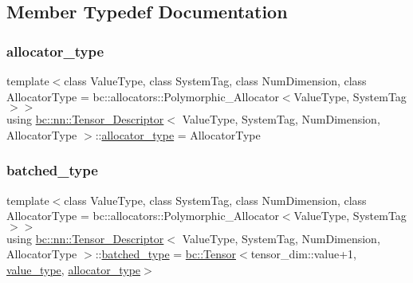 \subsection{Member Typedef Documentation}
\mbox{\label{structbc_1_1nn_1_1Tensor__Descriptor_ad5bd24271db1a9fb05b06cb64cad55a3}} 
\subsubsection{\texorpdfstring{allocator\+\_\+type}{allocator\_type}}
{\footnotesize\ttfamily template$<$class Value\+Type, class System\+Tag, class Num\+Dimension, class Allocator\+Type = bc\+::allocators\+::\+Polymorphic\+\_\+\+Allocator$<$\+Value\+Type, System\+Tag$>$$>$ \\
using \hyperlink{structbc_1_1nn_1_1Tensor__Descriptor}{bc\+::nn\+::\+Tensor\+\_\+\+Descriptor}$<$ Value\+Type, System\+Tag, Num\+Dimension, Allocator\+Type $>$\+::\hyperlink{structbc_1_1nn_1_1Tensor__Descriptor_ad5bd24271db1a9fb05b06cb64cad55a3}{allocator\+\_\+type} =  Allocator\+Type}

\mbox{\label{structbc_1_1nn_1_1Tensor__Descriptor_a5d27a53dccd4d6334aa3fd4092b07a9e}} 
\subsubsection{\texorpdfstring{batched\+\_\+type}{batched\_type}}
{\footnotesize\ttfamily template$<$class Value\+Type, class System\+Tag, class Num\+Dimension, class Allocator\+Type = bc\+::allocators\+::\+Polymorphic\+\_\+\+Allocator$<$\+Value\+Type, System\+Tag$>$$>$ \\
using \hyperlink{structbc_1_1nn_1_1Tensor__Descriptor}{bc\+::nn\+::\+Tensor\+\_\+\+Descriptor}$<$ Value\+Type, System\+Tag, Num\+Dimension, Allocator\+Type $>$\+::\hyperlink{structbc_1_1nn_1_1Tensor__Descriptor_a5d27a53dccd4d6334aa3fd4092b07a9e}{batched\+\_\+type} =  \hyperlink{namespacebc_a659391e47ab612be3ba6c18cf9c89159}{bc\+::\+Tensor}$<$tensor\+\_\+dim\+::value+1, \hyperlink{structbc_1_1nn_1_1Tensor__Descriptor_a25a52c900dabe88f90eba926ff8de1cd}{value\+\_\+type}, \hyperlink{structbc_1_1nn_1_1Tensor__Descriptor_ad5bd24271db1a9fb05b06cb64cad55a3}{allocator\+\_\+type}$>$}

